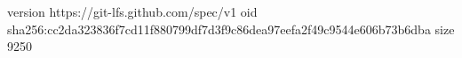 version https://git-lfs.github.com/spec/v1
oid sha256:cc2da323836f7cd11f880799df7d3f9c86dea97eefa2f49c9544e606b73b6dba
size 9250
